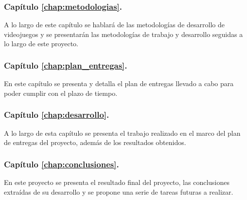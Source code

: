 \subsubsection{Capítulo \ref{chap:metodologias}. }

A lo largo de este capítulo se hablará de las metodologías de desarrollo de videojuegos y se presentarán las metodologías de trabajo y desarrollo seguidas a lo largo de este proyecto.

\subsubsection{Capítulo \ref{chap:plan_entregas}. }

En este capítulo se presenta y detalla el plan de entregas llevado a cabo para poder cumplir con el plazo de tiempo.

\subsubsection{Capítulo \ref{chap:desarrollo}. }

A lo largo de esta capítulo se presenta el trabajo realizado en el marco del plan de entregas del proyecto, además de los resultados obtenidos.

\subsubsection{Capítulo \ref{chap:conclusiones}. }

En este proyecto se presenta el resultado final del proyecto, las conclusiones extraídas de su desarrollo y se propone una serie de tareas futuras a realizar.